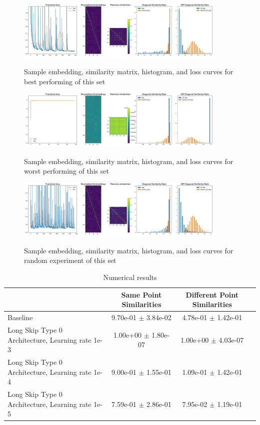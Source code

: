 \documentclass[a4paper]{article}
\begin{document}
\begin{figure}[H]
  \includegraphics[width=0.9\textwidth]{figures/rome16kknn0-longskip0-lr-1e-4-0}
  \label{fig:rome16kknn0-longskip0-lr-1e-4-0-sub1}
  \caption{Sample embedding, similarity matrix, histogram, and loss curves for best performing of this set}
\end{figure}
\begin{figure}[H]
  \includegraphics[width=0.9\textwidth]{figures/rome16kknn0-longskip0-lr-1e-3-0}
  \label{fig:rome16kknn0-longskip0-lr-1e-3-0-sub1}
  \caption{Sample embedding, similarity matrix, histogram, and loss curves for worst performing of this set}
\end{figure}
\begin{figure}[H]
  \includegraphics[width=0.9\textwidth]{figures/rome16kknn0-longskip0-lr-1e-5-0}
  \label{fig:rome16kknn0-longskip0-lr-1e-5-0-sub1}
  \caption{Sample embedding, similarity matrix, histogram, and loss curves for random experiment of this set}
\end{figure}
\begin{table}[H]
  \caption{Numerical results}
      \begin{tabular}{|l|c|c|c|} \hline
                                      &  Same Point Similarities  &  Different Point Similarities  \\ \hline
Baseline   & 9.70e-01 $\pm$ 3.84e-02 & 4.78e-01 $\pm$ 1.42e-01 \\ \hline
Long Skip Type 0 Architecture, Learning rate 1e-3   & 1.00e+00 $\pm$ 1.80e-07 & 1.00e+00 $\pm$ 4.03e-07 \\ \hline
Long Skip Type 0 Architecture, Learning rate 1e-4   & 9.00e-01 $\pm$ 1.55e-01 & 1.09e-01 $\pm$ 1.42e-01 \\ \hline
Long Skip Type 0 Architecture, Learning rate 1e-5   & 7.59e-01 $\pm$ 2.86e-01 & 7.95e-02 $\pm$ 1.19e-01 \\ \hline
      \end{tabular}
      \label{fig:tab1}
\end{table}
\end{document}
